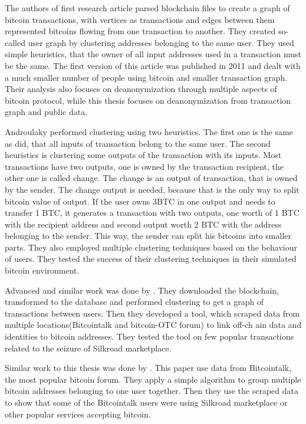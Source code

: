 \documentclass[
  digital, %
  table,   %
  lof,     %
  lot,     %
  oneside
]{fithesis3}
\begin{document}
The authors of first research article \parencite{reid2013analysis}
 parsed blockchain files to create a graph of bitcoin transactions, with vertices as transactions
 and edges between them represented bitcoins flowing from one transaction to another.
 They created so-called user graph by clustering addresses belonging to the same user.
 They used simple heuristics, that the owner of all input addresses used in a transaction must be the same. The first version of this article  
was published in 2011 and dealt with a much smaller number of people using bitcoin and smaller transaction graph.
Their analysis also focuses on deanonymization through multiple aspects of bitcoin protocol,
while this thesis focuses on deanonymization from transaction graph and public data.

Androulaky \parencite{androulaki2013evaluating} performed clustering using two heuristics.
The first one is the same as \parencite{reid2013analysis} did, that all inputs of transaction
belong to the same user. The second heuristics is clustering some outputs of the transaction with its inputs.
Most transactions have two outputs, one is owned by the transaction recipient,
the other one is called change. The change is an output of transaction, that is owned by
the sender. The change output is needed, because that is the only way to split bitcoin value of output.
 If the user owns 3BTC in one output and needs to transfer 1 BTC, it generates a transaction with two outputs, one worth of 1 BTC with the recipient address and second output worth 2 BTC 
 with the address belonging to the sender. This way, the sender can split his bitcoins into smaller parts.
 They also employed multiple clustering techniques based on the behaviour of users.
 They tested the success of their clustering techniques in their simulated bitcoin 
 environment.

Advanced and similar work was done by \parencite{spagnuolo2014bitiodine}. They downloaded the blockchain, transformed to
 the database
and performed clustering to get a graph of transactions between users.
Then they developed a tool, which scraped data from multiple locations(Bitcointalk and bitcoin-OTC forum) to link off-ch
ain data and identities to bitcoin addresses.
They tested the tool on few popular transactions related to the seizure of Silkroad marketplace.

Similar work to this thesis was done by \parencite{fleder2015bitcoin}.
This paper use data from Bitcointalk, the most popular bitcoin forum. 
They apply a simple algorithm to group multiple bitcoin addresses belonging to one user together.
Then they use the scraped data to show
that some of the Bitcointalk users were using Silkroad marketplace or other popular services accepting bitcoin.
 
\end{document}
